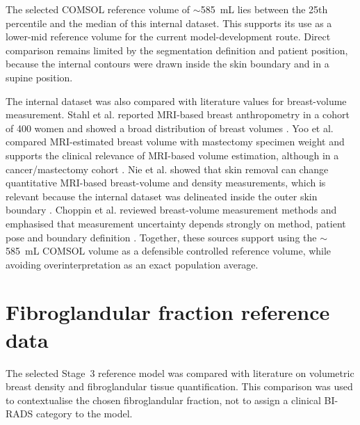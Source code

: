 The selected COMSOL reference volume of $\sim$585~mL lies between the 25th percentile and the median of this internal dataset. This supports its use as a lower-mid reference volume for the current model-development route. Direct comparison remains limited by the segmentation definition and patient position, because the internal contours were drawn inside the skin boundary and in a supine position.

The internal dataset was also compared with literature values for breast-volume measurement. Stahl et al. reported MRI-based breast anthropometry in a cohort of 400 women and showed a broad distribution of breast volumes \cite{Stahl2023}. Yoo et al. compared MRI-estimated breast volume with mastectomy specimen weight and supports the clinical relevance of MRI-based volume estimation, although in a cancer/mastectomy cohort \cite{Yoo2013}. Nie et al. showed that skin removal can change quantitative MRI-based breast-volume and density measurements, which is relevant because the internal dataset was delineated inside the outer skin boundary \cite{Nie2010SkinRemoval}. Choppin et al. reviewed breast-volume measurement methods and emphasised that measurement uncertainty depends strongly on method, patient pose and boundary definition \cite{Choppin2016}. Together, these sources support using the $\sim$585~mL COMSOL volume as a defensible controlled reference volume, while avoiding overinterpretation as an exact population average.

\newpage
\section{Fibroglandular fraction reference data}
\label{sec:appendix_glandular_fraction_reference}

The selected Stage~3 reference model was compared with literature on volumetric breast density and fibroglandular tissue quantification. This comparison was used to contextualise the chosen fibroglandular fraction, not to assign a clinical BI-RADS category to the model.

